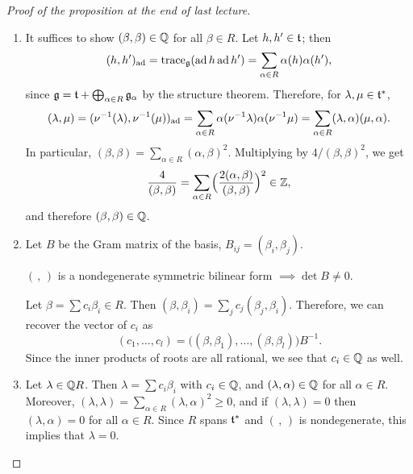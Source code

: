 \begin{proof}[Proof of the proposition at the end of last lecture]\leavevmode
\begin{enumerate}
  \item It suffices to show $(\beta, \beta) \in \mathbb{Q}$ for all $\beta \in R$.
    Let $h, h' \in \mathfrak{t}$; then
    \[
      (h, h')_{\operatorname{ad}} = \operatorname{trace}_{\mathfrak{g}}(\operatorname{ad} h \operatorname{ad} h') = \sum_{\alpha \in R} \alpha(h)\alpha(h'),
    \]
    since $\mathfrak{g} = \mathfrak{t} + \bigoplus_{\alpha \in R} \mathfrak{g}_\alpha$ by the structure
    theorem. Therefore, for $\lambda, \mu \in \mathfrak{t}^*$,
    \[
      (\lambda, \mu) = (\nu^{-1}(\lambda), \nu^{-1}(\mu))_{\operatorname{ad}}
        = \sum_{\alpha \in R} \alpha(\nu^{-1}\lambda)\alpha(\nu^{-1}\mu)
        = \sum_{\alpha \in R} (\lambda, \alpha)(\mu, \alpha).
    \]
    In particular, $(\beta, \beta) = \sum_{\alpha \in R} (\alpha, \beta)^2$.
    Multiplying by $4/(\beta, \beta)^2$, we get
    \[
      \frac{4}{(\beta, \beta)} = \sum_{\alpha \in R}
        \Bigl(\frac{2(\alpha, \beta)}{(\beta, \beta)}\Bigr)^2 \in \mathbb{Z},
    \]
    and therefore $(\beta, \beta) \in \mathbb{Q}$.
  \item Let $B$ be the Gram matrix of the basis, $B_{ij} = (\beta_i, \beta_j)$.

    \begin{exercise}
    $(\,,\,)$ is a nondegenerate symmetric bilinear form $\implies \det B \neq 0$.
    \end{exercise}

    Let $\beta = \sum c_i\beta_i \in R$. Then
    $(\beta, \beta_i) = \sum_j c_j(\beta_j, \beta_i)$. Therefore, we can recover
    the vector of $c_i$ as
    \[
      (c_1, \dots, c_l) = \bigl((\beta, \beta_1), \dots, (\beta, \beta_l)\bigr)B^{-1}.
    \]
    Since the inner products of roots are all rational, we see that
    $c_i \in \mathbb{Q}$ as well.
  \item Let $\lambda \in \mathbb{Q} R$. Then $\lambda = \sum c_i\beta_i$ with
    $c_i \in \mathbb{Q}$, and $(\lambda, \alpha) \in \mathbb{Q}$ for all $\alpha \in R$.
    Moreover, $(\lambda, \lambda) = \sum_{\alpha \in R} (\lambda, \alpha)^2 \geq 0$,
    and if $(\lambda, \lambda) = 0$ then $(\lambda, \alpha) = 0$ for all
    $\alpha \in R$. Since $R$ spans $\mathfrak{t}^*$ and $(\,,\,)$ is nondegenerate,
    this implies that $\lambda = 0$. \qedhere
\end{enumerate}
\end{proof}
